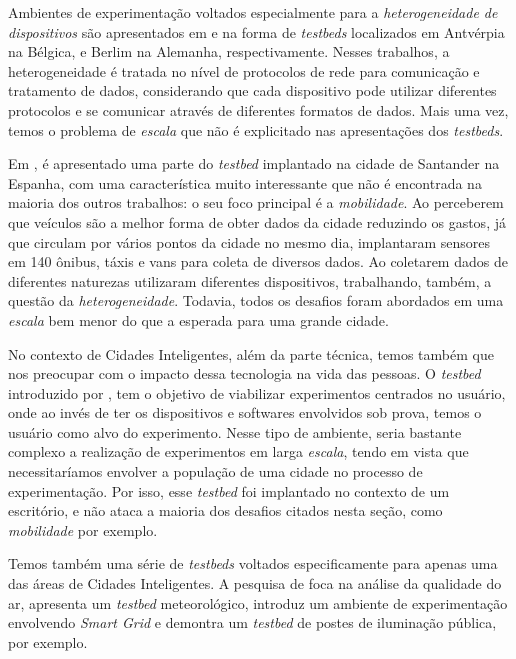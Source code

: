 Ambientes de experimentação voltados especialmente para a \textit{heterogeneidade de dispositivos} são apresentados em \cite{latre_2016} e \cite{juraschek_2012} na forma de \textit{testbeds} localizados
em Antvérpia na Bélgica, e Berlim na Alemanha, respectivamente.
Nesses trabalhos, a heterogeneidade é tratada no nível de protocolos de rede para comunicação e tratamento de dados, considerando que cada dispositivo pode utilizar diferentes protocolos e se comunicar
através de diferentes formatos de dados.
Mais uma vez, temos o problema de \textit{escala} que não é explicitado nas apresentações dos \textit{testbeds}.

Em \cite{lanza_2015}, é apresentado uma parte do \textit{testbed} implantado na cidade de Santander na Espanha, com uma característica muito interessante que não é encontrada na maioria dos outros
trabalhos: o seu foco principal é a \textit{mobilidade}.
Ao perceberem que veículos são a melhor forma de obter dados da cidade reduzindo os gastos, já que circulam por vários pontos da cidade no mesmo dia, implantaram sensores em 140 ônibus, táxis e vans
para coleta de diversos dados.
Ao coletarem dados de diferentes naturezas utilizaram diferentes dispositivos, trabalhando, também, a questão da \textit{heterogeneidade}.
Todavia, todos os desafios foram abordados em uma \textit{escala} bem menor do que a esperada para uma grande cidade.

No contexto de Cidades Inteligentes, além da parte técnica, temos também que nos preocupar com o impacto dessa tecnologia na vida das pessoas.
O \textit{testbed} introduzido por \cite{nati_2013}, tem o objetivo de viabilizar experimentos centrados no usuário, onde ao invés de ter os dispositivos e softwares envolvidos sob prova, temos
o usuário como alvo do experimento.
Nesse tipo de ambiente, seria bastante complexo a realização de experimentos em larga \textit{escala}, tendo em vista que necessitaríamos envolver a população de uma cidade no processo de
experimentação.
Por isso, esse \textit{testbed} foi implantado no contexto de um escritório, e não ataca a maioria dos desafios citados nesta seção, como \textit{mobilidade} por exemplo.

Temos também uma série de \textit{testbeds} voltados especificamente para apenas uma das áreas de Cidades Inteligentes.
A pesquisa de \cite{braem_2016} foca na análise da qualidade do ar, \cite{lee_2015} apresenta um \textit{testbed} meteorológico, \cite{lu_2010} introduz um ambiente de experimentação envolvendo
\textit{Smart Grid} e \cite{amrutur_2017} demontra um \textit{testbed} de postes de iluminação pública, por exemplo.

